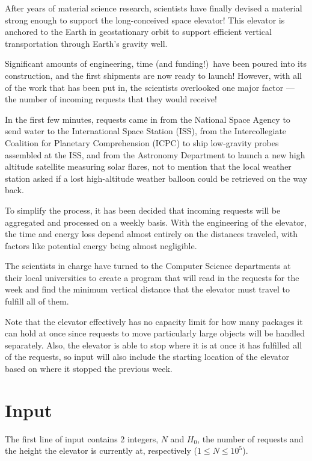 
After years of material science research, scientists have finally devised
a material strong enough to support the long-conceived space elevator!
This elevator is anchored to the Earth in geostationary orbit to support
efficient vertical transportation through Earth's gravity well.

Significant amounts of engineering, time (and funding!)\ have been poured
into its construction, and the first shipments are now ready to launch!
However, with all of the work that has been put in, the scientists
overlooked one major factor --- the number of incoming requests that they
would receive!

In the first few minutes, requests came in from the National Space Agency to 
send water to the International Space Station (ISS), from the 
Intercollegiate Coalition for Planetary Comprehension (ICPC) to ship 
low-gravity probes assembled at the ISS, and from the Astronomy Department 
to launch a new high altitude satellite measuring solar flares, not to 
mention that the local weather station asked if a lost high-altitude weather 
balloon could be retrieved on the way back.

To simplify the process, it has been decided that incoming requests will
be aggregated and processed on a weekly basis. With the engineering of
the elevator, the time and energy loss depend almost entirely on the
distances traveled, with factors like potential energy being almost
negligible.

The scientists in charge have turned to the Computer Science departments
at their local universities to create a program that will read in the
requests for the week and find the minimum vertical distance that the
elevator must travel to fulfill all of them.

Note that the elevator effectively has no capacity limit for how many
packages it can hold at once since requests to move particularly large
objects will be handled separately. Also, the elevator is able to stop
where it is at once it has fulfilled all of the requests, so input will
also include the starting location of the elevator based on where it
stopped the previous week.

\section*{Input}

The first line of input contains 2 integers, $N$ and $H_0$, the number
of requests and the height the elevator is currently at, respectively ($1
\leq N \leq 10^5$).

